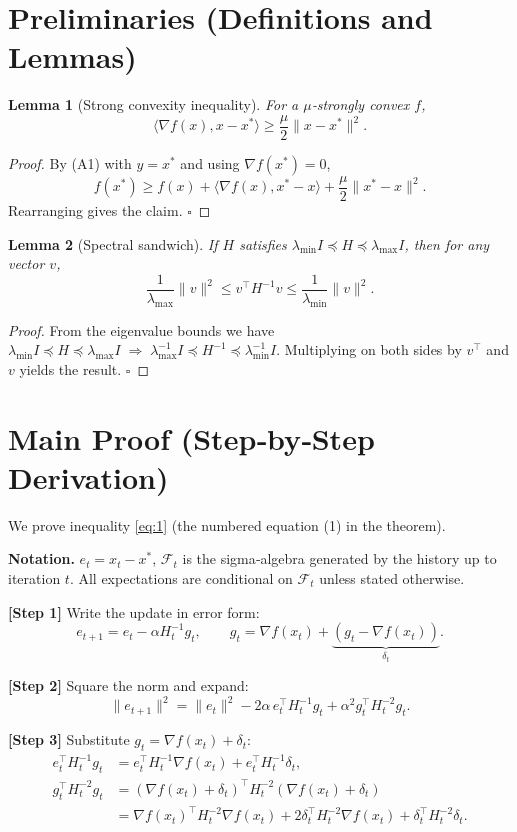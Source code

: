 \documentclass[11pt]{article}
\newtheorem{lemma}{Lemma}
\begin{document}
\section*{Preliminaries (Definitions and Lemmas)}
\begin{lemma}[Strong convexity inequality]\label{lem:sc}
For a $\mu$‑strongly convex $f$,
\[
\langle\nabla f(x),x-x^{*}\rangle\ge\frac{\mu}{2}\|x-x^{*}\|^{2}.
\]
\end{lemma}
\begin{proof}
By (A1) with $y=x^{*}$ and using $\nabla f(x^{*})=0$,
\[
f(x^{*})\ge f(x)+\langle\nabla f(x),x^{*}-x\rangle+\frac{\mu}{2}\|x^{*}-x\|^{2}.
\]
Rearranging gives the claim. \hfill $\square$
\end{proof}

\begin{lemma}[Spectral sandwich]\label{lem:sandwich}
If $H$ satisfies $\lambda_{\min}I\preceq H\preceq\lambda_{\max}I$, then for any
vector $v$,
\[
\frac{1}{\lambda_{\max}}\|v\|^{2}\le v^{\top}H^{-1}v\le\frac{1}{\lambda_{\min}}\|v\|^{2}.
\]
\end{lemma}
\begin{proof}
From the eigenvalue bounds we have
$\lambda_{\min}I\preceq H\preceq\lambda_{\max}I\;\Longrightarrow\;
\lambda_{\max}^{-1}I\preceq H^{-1}\preceq\lambda_{\min}^{-1}I$.
Multiplying on both sides by $v^{\top}$ and $v$ yields the result. \hfill $\square$
\end{proof}

\section*{Main Proof (Step‑by‑Step Derivation)}
We prove inequality \eqref{eq:1} (the numbered equation (1) in the theorem).

\medskip
\noindent\textbf{Notation.}  $e_{t}=x_{t}-x^{*}$, $\mathcal{F}_{t}$ is the sigma‑algebra
generated by the history up to iteration $t$.
All expectations are conditional on $\mathcal{F}_{t}$ unless stated otherwise.

\medskip
\noindent\textbf{[Step 1]}  Write the update in error form:
\[
e_{t+1}=e_{t}-\alpha H_{t}^{-1}g_{t},
\qquad g_{t}= \nabla f(x_{t})+ \underbrace{(g_{t}-\nabla f(x_{t}))}_{\delta_{t}} .
\]

\medskip
\noindent\textbf{[Step 2]}  Square the norm and expand:
\[
\|e_{t+1}\|^{2}
=\|e_{t}\|^{2}
-2\alpha\,e_{t}^{\!\top}H_{t}^{-1}g_{t}
+\alpha^{2}g_{t}^{\!\top}H_{t}^{-2}g_{t}.
\tag{3}
\]

\medskip
\noindent\textbf{[Step 3]}  Substitute $g_{t}= \nabla f(x_{t})+\delta_{t}$:
\[
\begin{aligned}
e_{t}^{\!\top}H_{t}^{-1}g_{t}
&=e_{t}^{\!\top}H_{t}^{-1}\nabla f(x_{t})
    +e_{t}^{\!\top}H_{t}^{-1}\delta_{t},\\[2mm]
g_{t}^{\!\top}H_{t}^{-2}g_{t}
&=(\nabla f(x_{t})+\delta_{t})^{\!\top}H_{t}^{-2}
   (\nabla f(x_{t})+\delta_{t})\\
&=\nabla f(x_{t})^{\!\top}H_{t}^{-2}\nabla f(x_{t})
   +2\delta_{t}^{\!\top}H_{t}^{-2}\nabla f(x_{t})
   +\delta_{t}^{\!\top}H_{t}^{-2}\delta_{t}.
\end{aligned}
\tag{4}
\]
\end{document}
